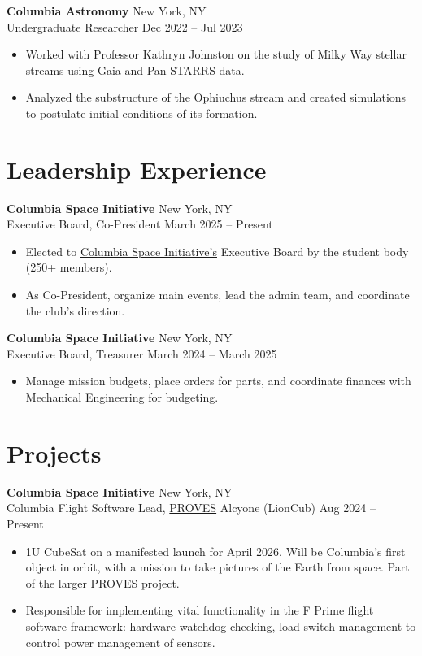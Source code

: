 \documentclass[a4paper,12pt]{article}
\newenvironment{joblong}[4]
    {
    \noindent\textbf{#1} \dotfill #2 \\
    \noindent #3 \dotfill #4 \\[3.75pt]
    \begin{minipage}[t]{\linewidth}
    \begin{itemize}[nosep,after=\strut, leftmargin=1em, itemsep=3pt,label=--]
    }
    {
    \end{itemize}
    \end{minipage}    
    }
\begin{document}
\begin{joblong}{Columbia Astronomy}{New York, NY}{Undergraduate Researcher}{Dec 2022 -- Jul 2023}
\item Worked with Professor Kathryn Johnston on the study of Milky Way stellar streams using Gaia and Pan-STARRS data.
\item Analyzed the substructure of the Ophiuchus stream and created simulations to postulate initial conditions of its formation.
\end{joblong}
  
\section{Leadership Experience}

\begin{joblong}{Columbia Space Initiative}{New York, NY}{Executive Board, Co-President}{March 2025 -- Present}
\item Elected to \href{https://columbiaspace.org/}{Columbia Space Initiative's} Executive Board by the student body (250+ members).
\item As Co-President, organize main events, lead the admin team, and coordinate the club's direction.
\end{joblong}

\begin{joblong}{Columbia Space Initiative}{New York, NY}{Executive Board, Treasurer}{March 2024 -- March 2025}
\item Manage mission budgets, place orders for parts, and coordinate finances with Mechanical Engineering for budgeting.
\end{joblong}

\section{Projects}

\begin{joblong}{Columbia Space Initiative}{New York, NY}{Columbia Flight Software Lead, \href{https://docs.proveskit.space/en/latest/}{PROVES} Alcyone (LionCub)}{Aug 2024 -- Present}
\item 1U CubeSat on a manifested launch for April 2026. Will be Columbia's first object in orbit, with a mission to take pictures of the Earth from space. Part of the larger PROVES project.
\item Responsible for implementing vital functionality in the F Prime flight software framework: hardware watchdog checking, load switch management to control power management of sensors.
\end{joblong}
\end{document}

